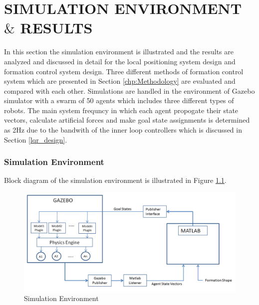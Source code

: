 

\chapter{SIMULATION ENVIRONMENT $\&$ RESULTS}
\label{chp:simulation}











	In this section the simulation environment is illustrated and the results are analyzed and discussed in detail for the local positioning system design and formation control system design. Three different methods of formation control system which are presented in Section \ref{chp:Methodology} are evaluated and compared with each other. Simulations are handled in the environment of Gazebo simulator with a swarm of 50 agents which includes three different types of robots. The main system frequncy in which each agent propogate their state vectors, calculate artificial forces and make goal state assignments is determined as 2Hz due to the bandwith of the inner loop controllers which is discussed in Section \ref{lqr_design}. 
	\subsection{Simulation Environment}
    Block diagram of the simulation environment is illustrated in Figure \ref{simulation_env_ref}.
    
    
    	\begin{figure}[H]
    		\caption{Simulation Environment} \label{simulation_env_ref}
    		\centering
    		\includegraphics[scale = 0.50]{environment}
    	\end{figure}
    

